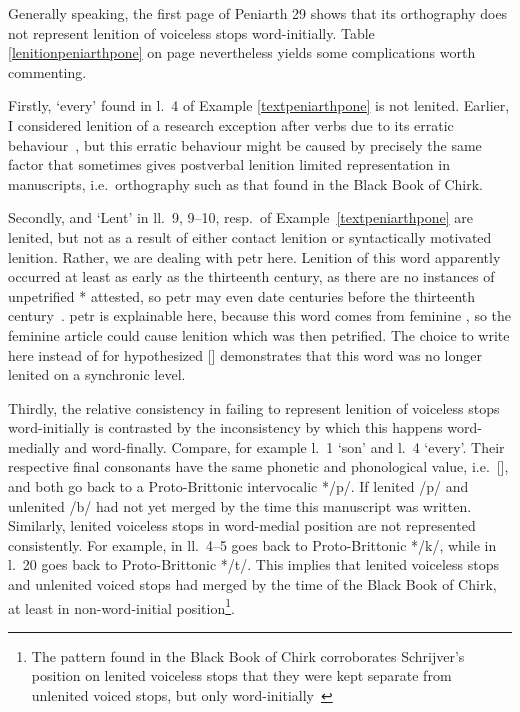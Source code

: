 Generally speaking, the first page of Peniarth 29 shows that its orthography does not represent lenition of voiceless stops word-initially. Table \ref{lenitionpeniarthpone} on page \pageref{lenitionpeniarthpone} nevertheless yields some complications worth commenting.


Firstly,  `every' found in l.~4 of Example \ref{textpeniarthpone} is not lenited. Earlier, I considered lenition of  a research exception after verbs due to its erratic behaviour~\parencite[24]{van_development14}, but this erratic behaviour might be caused by precisely the same factor that sometimes gives postverbal lenition limited representation in manuscripts, i.e.\ orthography such as that found in the Black Book of Chirk.

Secondly,  and  `Lent' in ll.~9, 9--10, resp.\ of Example~\ref{textpeniarthpone} are lenited, but not as a result of either contact lenition or syntactically motivated lenition. Rather, we are dealing with \gls{petr} here.
Lenition of this word apparently occurred at least as early as the thirteenth century, as there are no instances of unpetrified * attested, so \gls{petr} may even date centuries before the thirteenth century~\parencite[Grawys, Garawys]{bevan_geiriadur_2014}.
\Gls{petr} is explainable here, because this word comes from feminine , so the feminine article could cause lenition which was then petrified. The choice to write  here instead of  for hypothesized [\gd] demonstrates that this word was no longer lenited on a synchronic level. 

Thirdly, the relative consistency in failing to represent lenition of voiceless stops word-initially is contrasted by the inconsistency by which this happens word-medially and word-finally. Compare, for example l.~1  `son' and l.~4  `every'. Their respective final consonants have the same phonetic and phonological value, i.e.\ [\bd], and both go back to a Proto-Brittonic intervocalic */p/. If lenited /p/ and unlenited /b/ had not yet merged by the time this manuscript was written. Similarly, lenited voiceless stops in word-medial position are not represented consistently. For example,  in ll.~4–5  goes back to Proto-Brittonic */k/, while  in l.~20  goes back to Proto-Brittonic */t/. This implies that lenited voiceless stops and unlenited voiced stops had merged by the time of the Black Book of Chirk, at least in non-word-initial position\footnote{The pattern found in the Black Book of Chirk corroborates Schrijver's position on lenited voiceless stops that they were kept separate from unlenited voiced stops, but only word-initially~\autocite[31]{schrijver_old_2011}}.


